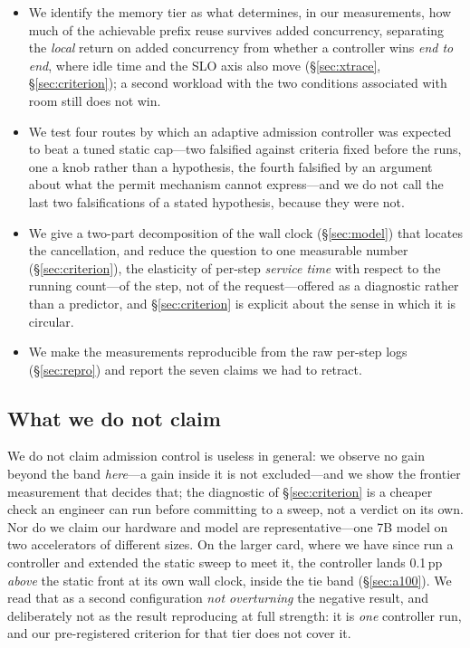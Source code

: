 \begin{itemize}
  \item We identify the memory tier as what determines, in our
        measurements, how much of the achievable prefix reuse survives added
        concurrency, separating the \emph{local} return on added concurrency
        from whether a controller wins \emph{end to end}, where idle time and
        the SLO axis also move (\S\ref{sec:xtrace}, \S\ref{sec:criterion});
        a second workload with the two conditions associated with room still
        does not win.
  \item We test four routes by which an adaptive admission controller was
        expected to beat a tuned static cap---two falsified against criteria
        fixed before the runs, one a knob rather than a hypothesis, the fourth
        falsified by an argument about what the permit mechanism cannot
        express---and we do not call the last two falsifications of a stated
        hypothesis, because they were not.
  \item We give a two-part decomposition of the wall clock (\S\ref{sec:model})
        that locates the cancellation, and reduce the question to one measurable
        number (\S\ref{sec:criterion}), the elasticity of per-step \emph{service
        time} with respect to the running count---of the step, not of the
        request---offered as a diagnostic rather than a predictor, and
        \S\ref{sec:criterion} is explicit about the sense in which it is
        circular.
  \item We make the measurements reproducible from the raw per-step logs
        (\S\ref{sec:repro}) and report the seven claims we had to retract.
\end{itemize}

\subsection{What we do not claim}

We do not claim admission control is useless in general: we observe no gain beyond
the band \emph{here}---a gain inside it is not excluded---and we show the frontier
measurement that decides that; the
diagnostic of \S\ref{sec:criterion} is a cheaper check an engineer can run before
committing to a sweep, not a verdict on its own. Nor do we claim our hardware and model are
representative---one 7B model on two accelerators of different sizes. On the larger card, where we have since run a
controller and extended the static sweep to meet it, the controller lands
0.1\,pp \emph{above} the static front at its own wall clock, inside the tie band
(\S\ref{sec:a100}). We read that as a second configuration \emph{not
overturning} the negative result, and deliberately not as the result reproducing
at full strength: it is \emph{one} controller run, and our pre-registered criterion
for that tier does not cover it.
